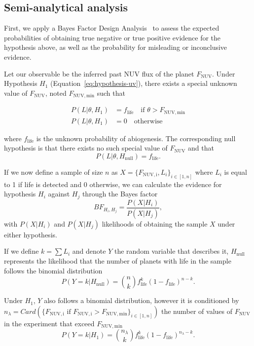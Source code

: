 \documentclass[modern,linenumbers]{aastex631}
\begin{document}
\subsection{Semi-analytical analysis}\label{sec:met-semianalytical}
First, we apply a Bayes Factor Design Analysis~\citep{Schoenbrodt2018} to assess the expected probabilities of obtaining true negative or true positive evidence for the hypothesis above, as well as the probability for misleading or inconclusive evidence.

Let our observable be the inferred past \gls{NUV} flux of the planet $F_\mathrm{NUV}$.
Under Hypothesis $H_1$ (Equation~\ref{eq:hypothesis-uv}), there exists a special unknown value of $F_\mathrm{NUV}$, noted $F_\mathrm{NUV, min}$ such that

\begin{align}
    P(L|\theta,H_1) &=  f_\mathrm{life} \quad \text{if } \theta>F_\mathrm{NUV, min}\\
    P(L|\theta,H_1) &=  0               \quad  \text{otherwise}
\end{align}

where $f_\mathrm{life}$ is the unknown probability of abiogenesis.
The corresponding null hypothesis is that there exists no such special value of $F_\mathrm{NUV}$ and that
\begin{equation}
P(L|\theta,H_\mathrm{null}) = f_\mathrm{life}.
\end{equation}

If we now define a sample of size $n$ as $X=\{F_\mathrm{NUV, i},L_i\}_{i \in [1,n]}$ where $L_i$ is equal to 1 if life is detected and 0 otherwise, we can calculate the evidence for hypothesis $H_i$ against $H_j$ through the Bayes factor
\begin{equation}
BF_{H_i,H_j} = \frac{P(X|H_i)}{P(X|H_j)},
\end{equation}
with $P(X|H_i)$ and $P(X|H_j)$ likelihoods of obtaining the sample $X$ under either hypothesis.

If we define $k=\sum L_i$ and denote $Y$ the random variable that describes it, $H_\mathrm{null}$ represents the likelihood that the number of planets with life in the sample follows the binomial distribution
\begin{equation}
P(Y=k|H_\mathrm{null}) = \binom{n}{k}f_\mathrm{life}^k(1-f_\mathrm{life})^{n-k}.
\end{equation}

Under $H_1$, $Y$ also follows a binomial distribution, however it is conditioned by $n_{\lambda}=Card(\{F_\mathrm{NUV, i} \text{ if } F_\mathrm{NUV, i}>F_\mathrm{NUV, min}\}_{i \in [1,n]})$ the number of values of $F_\mathrm{NUV}$ in the experiment that exceed $F_\mathrm{NUV, min}$
\begin{equation}
P(Y=k|H_1) = \binom{n_{\lambda}}{k}f_\mathrm{life}^k(1-f_\mathrm{life})^{n_{\lambda}-k}.
\end{equation}
\end{document}
